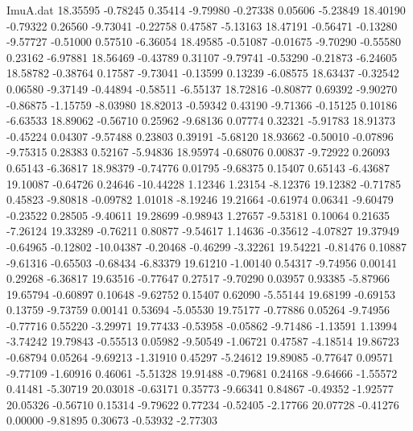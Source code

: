 \begin{filecontents}{ImuA.dat}
  18.35595   -0.78245    0.35414   -9.79980   -0.27338    0.05606   -5.23849
  18.40190   -0.79322    0.26560   -9.73041   -0.22758    0.47587   -5.13163
  18.47191   -0.56471   -0.13280   -9.57727   -0.51000    0.57510   -6.36054
  18.49585   -0.51087   -0.01675   -9.70290   -0.55580    0.23162   -6.97881
  18.56469   -0.43789    0.31107   -9.79741   -0.53290   -0.21873   -6.24605
  18.58782   -0.38764    0.17587   -9.73041   -0.13599    0.13239   -6.08575
  18.63437   -0.32542    0.06580   -9.37149   -0.44894   -0.58511   -6.55137
  18.72816   -0.80877    0.69392   -9.90270   -0.86875   -1.15759   -8.03980
  18.82013   -0.59342    0.43190   -9.71366   -0.15125    0.10186   -6.63533
  18.89062   -0.56710    0.25962   -9.68136    0.07774    0.32321   -5.91783
  18.91373   -0.45224    0.04307   -9.57488    0.23803    0.39191   -5.68120
  18.93662   -0.50010   -0.07896   -9.75315    0.28383    0.52167   -5.94836
  18.95974   -0.68076    0.00837   -9.72922    0.26093    0.65143   -6.36817
  18.98379   -0.74776    0.01795   -9.68375    0.15407    0.65143   -6.43687
  19.10087   -0.64726    0.24646  -10.44228    1.12346    1.23154   -8.12376
  19.12382   -0.71785    0.45823   -9.80818   -0.09782    1.01018   -8.19246
  19.21664   -0.61974    0.06341   -9.60479   -0.23522    0.28505   -9.40611
  19.28699   -0.98943    1.27657   -9.53181    0.10064    0.21635   -7.26124
  19.33289   -0.76211    0.80877   -9.54617    1.14636   -0.35612   -4.07827
  19.37949   -0.64965   -0.12802  -10.04387   -0.20468   -0.46299   -3.32261
  19.54221   -0.81476    0.10887   -9.61316   -0.65503   -0.68434   -6.83379
  19.61210   -1.00140    0.54317   -9.74956    0.00141    0.29268   -6.36817
  19.63516   -0.77647    0.27517   -9.70290    0.03957    0.93385   -5.87966
  19.65794   -0.60897    0.10648   -9.62752    0.15407    0.62090   -5.55144
  19.68199   -0.69153    0.13759   -9.73759    0.00141    0.53694   -5.05530
  19.75177   -0.77886    0.05264   -9.74956   -0.77716    0.55220   -3.29971
  19.77433   -0.53958   -0.05862   -9.71486   -1.13591    1.13994   -3.74242
  19.79843   -0.55513    0.05982   -9.50549   -1.06721    0.47587   -4.18514
  19.86723   -0.68794    0.05264   -9.69213   -1.31910    0.45297   -5.24612
  19.89085   -0.77647    0.09571   -9.77109   -1.60916    0.46061   -5.51328
  19.91488   -0.79681    0.24168   -9.64666   -1.55572    0.41481   -5.30719
  20.03018   -0.63171    0.35773   -9.66341    0.84867   -0.49352   -1.92577
  20.05326   -0.56710    0.15314   -9.79622    0.77234   -0.52405   -2.17766
  20.07728   -0.41276    0.00000   -9.81895    0.30673   -0.53932   -2.77303

\end{filecontents}
